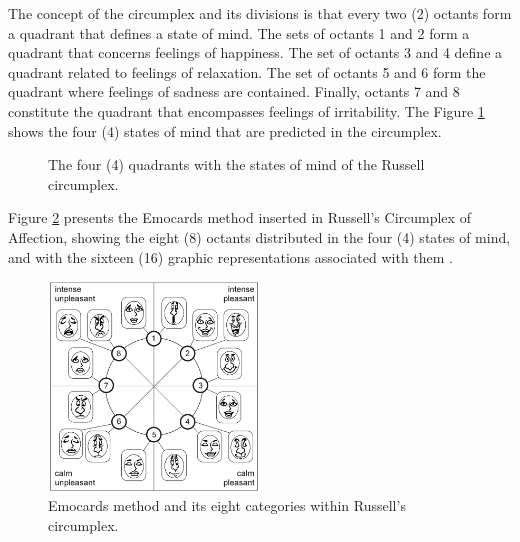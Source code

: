 The concept of the circumplex and its divisions is that every two (2) octants form a quadrant that defines a state of mind.
The sets of octants 1 and 2 form a quadrant that concerns feelings of happiness.
The set of octants 3 and 4 define a quadrant related to feelings of relaxation.
The set of octants 5 and 6 form the quadrant where feelings of sadness are contained.
Finally, octants 7 and 8 constitute the quadrant that encompasses feelings of irritability.
The Figure \ref{fig:Octantes} shows the four (4) states of mind that are predicted in the circumplex.

\begin{figure}[!htb]
        \centering
        \caption{The four (4) quadrants with the states of mind of the Russell circumplex.}
        \label{fig:Octantes}
        
\end{figure}

Figure \ref{fig:EmocardsMethod} presents the Emocards method inserted in Russell's Circumplex of Affection, showing the eight (8) octants distributed in the four (4) states of mind, and with the sixteen (16) graphic representations associated with them .

\begin{figure}[!htb]
        \centering
        \caption{Emocards method and its eight categories within Russell's circumplex.}
        \label{fig:EmocardsMethod}
        \includegraphics[width=0.5\textwidth]{img/Emocards.png}
\end{figure}

